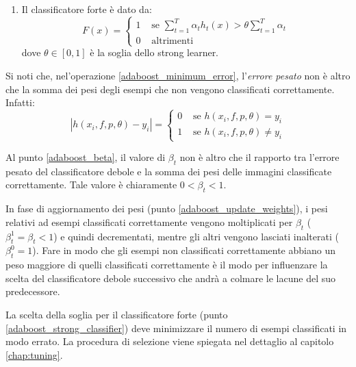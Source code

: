 \begin{enumerate}
                \item \label{adaboost_strong_classifier} Il classificatore forte è dato da:
                \begin{equation}\label{eq:strong_classifier}
                    F(x) = 
                    \begin{cases}
                        1 & \text{ se } \sum_{t = 1}^{T} \alpha_t h_t(x) > \theta \sum_{t = 1}^{T} \alpha_t \\
                        0 & \text{ altrimenti }
                    \end{cases}
                \end{equation}
                dove $\theta \in [0,1]$ è la soglia dello strong learner.
            \end{enumerate}
            
            Si noti che, nel'operazione \ref{adaboost_minimum_error}, l'\emph{errore pesato} non è altro che la somma dei pesi degli esempi che non vengono classificati correttamente. 
            Infatti:
            \begin{equation}
                \label{subeq:minimum_error_evaluation}
                |h(x_i, f, p, \theta) - y_i| = 
                \begin{cases}
                    0 & \text{ se } h(x_i, f, p, \theta) = y_i \\
                    1 & \text{ se } h(x_i, f, p, \theta) \neq y_i
                \end{cases}
            \end{equation}

            Al punto \ref{adaboost_beta}, il valore di $\beta_t$ non è altro che il rapporto tra l'errore pesato del classificatore debole e la somma dei pesi delle immagini classificate correttamente. Tale valore è chiaramente $0 < \beta_t < 1$.

            In fase di aggiornamento dei pesi (punto \ref{adaboost_update_weights}), i pesi relativi ad esempi classificati correttamente vengono moltiplicati per $\beta_t$ ($\beta_{t}^{1} = \beta_t < 1$) e quindi decrementati, mentre gli altri vengono lasciati inalterati ($\beta_{t}^{0} = 1$). 
            Fare in modo che gli esempi non classificati correttamente abbiano un peso maggiore di quelli classificati correttamente è il modo per influenzare la scelta del classificatore debole successivo che andrà a colmare le lacune del suo predecessore.

            La scelta della soglia per il classificatore forte (punto \ref{adaboost_strong_classifier}) deve minimizzare il numero di esempi classificati in modo errato.
            La procedura di selezione viene spiegata nel dettaglio al capitolo \ref{chap:tuning}.
    
